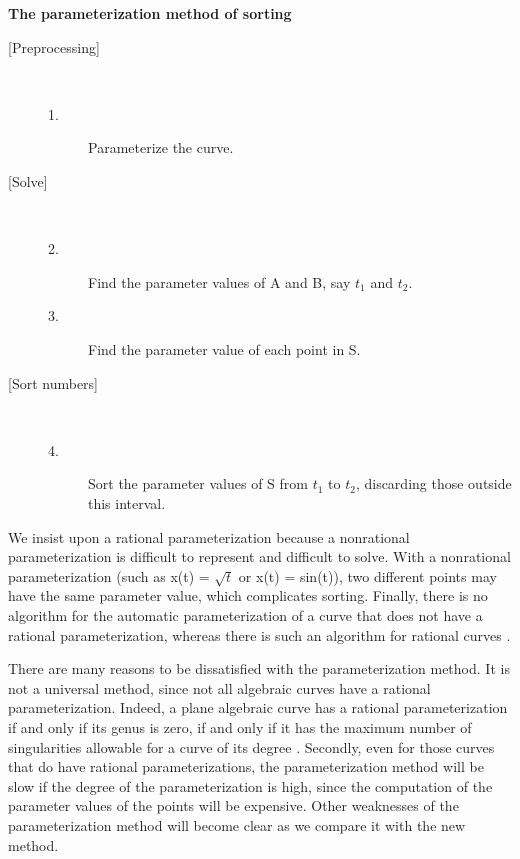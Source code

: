 \begin{center}{\bf The parameterization method of sorting}\end{center}
\begin{description}
\item[{[Preprocessing]}] \ \ \ 
\begin{description}
\item[1.] Parameterize the curve.
\end{description}
\clearpage
%
\item[{[Solve]}] \ \ \ 
\begin{description}
\item[2.]
	Find the parameter values of A and B, say $t_{1}$ and $t_{2}$.
\item[3.]
	Find the parameter value of each point in S.
\end{description}
%
\item[{[Sort numbers]}] \ \ \ 
\begin{description}
\item[4.]
	Sort the parameter values of S from $t_{1}$ to $t_{2}$, discarding
	those outside this interval.
\end{description}
\end{description}
%
We insist upon a rational parameterization because a nonrational 
parameterization is difficult to represent and difficult to solve. 
With a nonrational parameterization (such as x(t) = $\sqrt{t}$ or x(t) = sin(t)),
two different points may have the same parameter value, which complicates sorting.
Finally, there is no algorithm for the automatic parameterization of a curve 
that does not have a rational parameterization, whereas there is such an algorithm
for rational curves \cite{abba3}.

There are many reasons to be dissatisfied with the parameterization method.
It is not a universal method, since not all algebraic curves have a 
rational parameterization.
Indeed, a plane algebraic curve has a rational parameterization if and only if its
genus is zero, if and only if it has the maximum number of singularities 
allowable for a curve of its degree \cite{walker}.  
Secondly, even for those curves that do have rational parameterizations, 
the parameterization method will be slow if the degree of the parameterization 
is high, since the computation of the parameter values of the points will 
be expensive.
Other weaknesses of the parameterization method will become clear as we compare
it with the new method.

